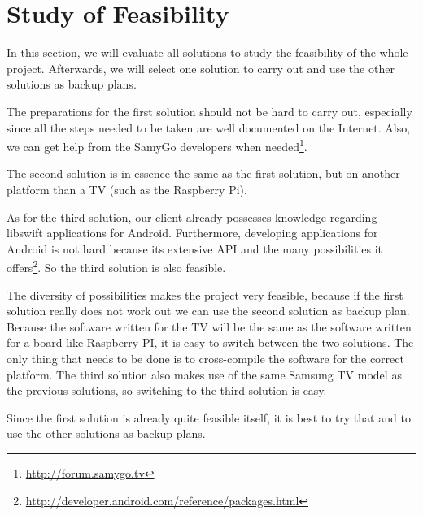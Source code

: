 \chapter{Study of Feasibility}

In this section, we will evaluate all solutions to study the feasibility of the whole project.
Afterwards, we will select one solution to carry out and use the other solutions as backup plans.

The preparations for the first solution should not be hard to carry out, 
especially since all the steps needed to be taken are well documented on the Internet.
Also, we can get help from the SamyGo developers when needed\footnote{\url{http://forum.samygo.tv}}.

The second solution is in essence the same as the first solution, but on another platform than a TV (such as the Raspberry Pi). 

As for the third solution, 
our client already possesses knowledge regarding libswift applications for Android.
Furthermore, developing applications for Android is not hard 
because its extensive API and the many possibilities it offers\footnote{\url{http://developer.android.com/reference/packages.html}}.
So the third solution is also feasible.

The diversity of possibilities makes the project very feasible, 
because if the first solution really does not work out we can use the second solution as backup plan. 
Because the software written for the TV will be the same as the software written for a board like Raspberry PI, 
it is easy to switch between the two solutions. 
The only thing that needs to be done is to cross-compile the software for the correct platform. 
The third solution also makes use of the same Samsung TV model as the previous solutions, 
so switching to the third solution is easy. 

Since the first solution is already quite feasible itself, 
it is best to try that and to use the other solutions as backup plans.
